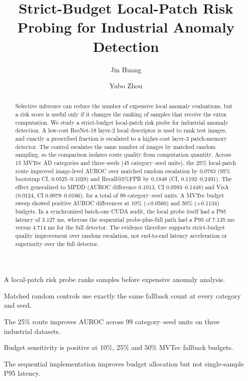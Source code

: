 \documentclass[preprint,12pt]{elsarticle}
\begin{document}
\begin{frontmatter}

\title{Strict-Budget Local-Patch Risk Probing for Industrial Anomaly Detection}

\author[guangxi]{Jin Huang}
\author[shangqiu]{Yubo Zhou}


\begin{abstract}
Selective inference can reduce the number of expensive local anomaly evaluations, but a risk score is useful only if it changes the ranking of samples that receive the extra computation. We study a strict-budget local-patch risk probe for industrial anomaly detection. A low-cost ResNet-18 layer-2 local descriptor is used to rank test images, and exactly a prescribed fraction is escalated to a higher-cost layer-3 patch-memory detector. The control escalates the same number of images by matched random sampling, so the comparison isolates route quality from computation quantity. Across 15 MVTec AD categories and three seeds (45 category--seed units), the 25\% local-patch route improved image-level AUROC over matched random escalation by 0.0783 (95\% bootstrap CI, 0.0525--0.1029) and Recall@5\%FPR by 0.1848 (CI, 0.1192--0.2491). The effect generalized to MPDD (AUROC difference 0.1013, CI 0.0593--0.1448) and VisA (0.0124, CI 0.0079--0.0166), for a total of 99 category--seed units. A MVTec budget sweep showed positive AUROC differences at 10\% (+0.0560) and 50\% (+0.1134) budgets. In a synchronized batch-one CUDA audit, the local probe itself had a P95 latency of 3.127 ms, whereas the sequential probe-plus-full path had a P95 of 7.135 ms versus 4.714 ms for the full detector. The evidence therefore supports strict-budget quality improvement over random escalation, not end-to-end latency acceleration or superiority over the full detector.
\end{abstract}

\begin{highlights}
\item A local-patch risk probe ranks samples before expensive anomaly analysis.
\item Matched random controls use exactly the same fallback count at every category and seed.
\item The 25\% route improves AUROC across 99 category--seed units on three industrial datasets.
\item Budget sensitivity is positive at 10\%, 25\% and 50\% MVTec fallback budgets.
\item The sequential implementation improves budget allocation but not single-sample P95 latency.
\end{highlights}


\end{frontmatter}
\end{document}
